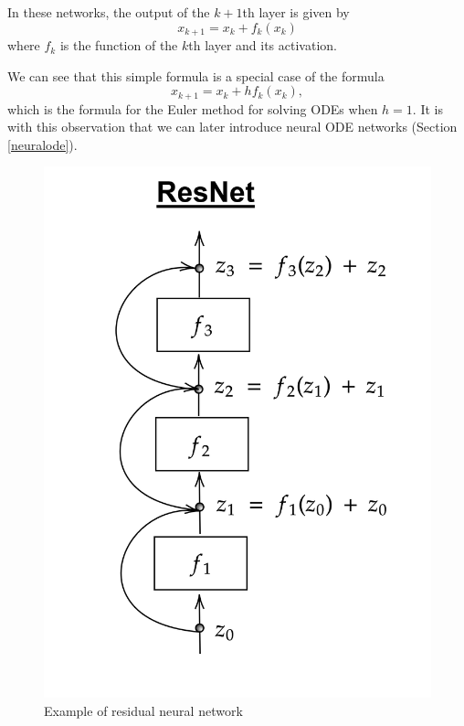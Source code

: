 \documentclass[10pt,a4paper]{article}
\theoremstyle{definition}
\theoremstyle{definition}
\theoremstyle{definition}
\begin{document}
In these networks, the output of the $k+1$th layer is given by
\begin{equation*}
x_{k+1} = x_k + f_k(x_k)
\end{equation*}
where $f_k$ is the function of the $k$th layer and its activation. 

We can see that this simple formula is a special case of the formula
\begin{equation*}
x_{k+1} = x_k + hf_k(x_k),
\end{equation*}
which is the formula for the Euler method for solving ODEs when $h = 1$. It is with this observation that we can later introduce neural ODE networks (Section \ref{neuralode}).

\begin{figure}
\center
\includegraphics[scale=0.18]{resnet.png}
\caption{Example of residual neural network}
\label{exampleresnet}
\end{figure}
\end{document}
